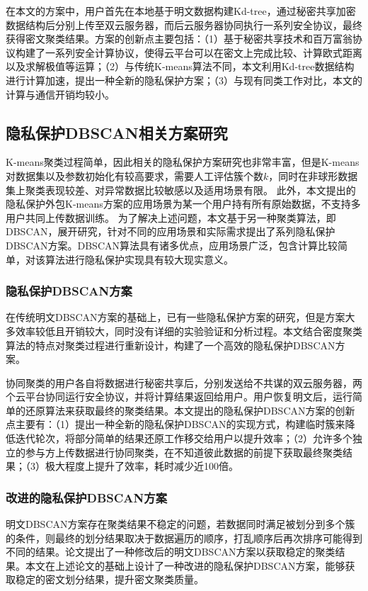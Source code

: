在本文的方案中，用户首先在本地基于明文数据构建Kd-tree，通过秘密共享加密数据结构后分别上传至双云服务器，而后云服务器协同执行一系列安全协议，最终获得密文聚类结果。方案的创新点主要包括：（1）基于秘密共享技术和百万富翁协议\cite{rathee2020cryptflow2}构建了一系列安全计算协议，使得云平台可以在密文上完成比较、计算欧式距离以及求解极值等运算；（2）与传统K-means算法不同，本文利用Kd-tree数据结构进行计算加速，提出一种全新的隐私保护方案；（3）与现有同类工作对比，本文的计算与通信开销均较小。

\subsection{隐私保护DBSCAN相关方案研究}
K-means聚类过程简单，因此相关的隐私保护方案研究也非常丰富，但是K-means对数据集以及参数初始化有较高要求，需要人工评估簇个数$ k $，同时在非球形数据集上聚类表现较差、对异常数据比较敏感以及适用场景有限。
此外，本文提出的隐私保护外包K-means方案的应用场景为某一个用户持有所有原始数据，不支持多用户共同上传数据训练。
为了解决上述问题，本文基于另一种聚类算法，即DBSCAN，展开研究，针对不同的应用场景和实际需求提出了系列隐私保护DBSCAN方案。DBSCAN算法具有诸多优点，应用场景广泛，包含计算比较简单，对该算法进行隐私保护实现具有较大现实意义。

\subsubsection{隐私保护DBSCAN方案}
\label{fanganyi}
在传统明文DBSCAN方案\cite{1996A}的基础上，已有一些隐私保护方案的研究\cite{2006Privacy,2021Privacy}，但是方案大多效率较低且开销较大，同时没有详细的实验验证和分析过程。本文结合密度聚类算法的特点对聚类过程进行重新设计，构建了一个高效的隐私保护DBSCAN方案。

协同聚类的用户各自将数据进行秘密共享后，分别发送给不共谋的双云服务器，两个云平台协同运行安全协议，并将计算结果返回给用户。用户恢复明文后，运行简单的还原算法来获取最终的聚类结果。本文提出的隐私保护DBSCAN方案的创新点主要有：（1）提出一种全新的隐私保护DBSCAN的实现方式，构建临时簇来降低迭代轮次，将部分简单的结果还原工作移交给用户以提升效率；（2）允许多个独立的参与方上传数据进行协同聚类，在不知道彼此数据的前提下获取最终聚类结果；（3）极大程度上提升了效率，耗时减少近100倍。
\subsubsection{改进的隐私保护DBSCAN方案}
明文DBSCAN方案存在聚类结果不稳定的问题，若数据同时满足被划分到多个簇的条件，则最终的划分结果取决于数据遍历的顺序，打乱顺序后再次排序可能得到不同的结果。论文\cite{tran2013revised}提出了一种修改后的明文DBSCAN方案以获取稳定的聚类结果。本文在上述论文的基础上设计了一种改进的隐私保护DBSCAN方案，能够获取稳定的密文划分结果，提升密文聚类质量。

